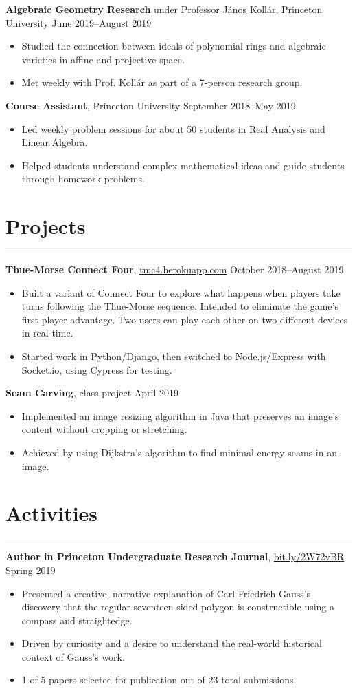 \documentclass[10pt]{article}
\newcommand{\resumesection}[1]{\vspace{-0.2cm}\section*{#1}\vspace{-0.2cm}\hrule\vspace{0.2cm}}
\begin{document}
\textbf{Algebraic Geometry Research} under Professor J\'{a}nos Koll\'{a}r, Princeton University \hfill June 2019--August 2019
\begin{itemize}
	\item Studied the connection between ideals of polynomial rings and algebraic varieties in affine and projective space.
	\item Met weekly with Prof. Koll\'{a}r as part of a 7-person research group.
\end{itemize}

\textbf{Course Assistant}, Princeton University \hfill September 2018--May 2019
\begin{itemize}
	\item Led weekly problem sessions for about 50 students in Real Analysis and Linear Algebra.
	\item Helped students understand complex mathematical ideas and guide students through homework problems.
\end{itemize}

\resumesection{Projects}

\textbf{Thue-Morse Connect Four}, \href{https://tmc4.herokuapp.com}{tmc4.herokuapp.com}  \hfill October 2018--August 2019
\begin{itemize}
	\item Built a variant of Connect Four to explore what happens when players take turns following the Thue-Morse sequence. Intended to eliminate the game's first-player advantage. Two users can play each other on two different devices in real-time.
	\item Started work in Python/Django, then switched to Node.js/Express with Socket.io, using Cypress for testing.
\end{itemize}

\textbf{Seam Carving}, class project \hfill April 2019
\begin{itemize}
	\item Implemented an image resizing algorithm in Java that preserves an image's content without cropping or stretching.
	\item Achieved by using Dijkstra's algorithm to find minimal-energy seams in an image.
\end{itemize}

\resumesection{Activities}

\textbf{Author in Princeton Undergraduate Research Journal}, \href{https://bit.ly/2W72vBR}{bit.ly/2W72vBR} \hfill Spring 2019
\begin{itemize}
	\item Presented a creative, narrative explanation of Carl Friedrich Gauss's discovery that the regular seventeen-sided polygon is constructible using a compass and straightedge.
	\item Driven by curiosity and a desire to understand the real-world historical context of Gauss's work.
	\item 1 of 5 papers selected for publication out of 23 total submissions.
\end{itemize}
\end{document}
